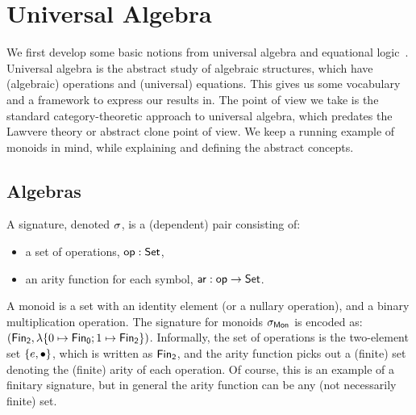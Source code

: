 \section{Universal Algebra}
\label{sec:universal-algebra}

We first develop some basic notions from universal algebra and equational
logic~\cite{birkhoffStructureAbstractAlgebras1935}.
%
Universal algebra is the abstract study of algebraic structures, which have (algebraic) operations and (universal)
equations.
%
This gives us some vocabulary and a framework to express our results in.
%
The point of view we take is the standard category-theoretic approach to universal algebra, which predates the Lawvere
theory or abstract clone point of view.
%
We keep a running example of monoids in mind, while explaining and defining the abstract concepts.

\subsection{Algebras}
\label{sec:universal-algebra:algebras}

\begin{definition}[Signature]
    A signature, denoted $\sigma$, is a (dependent) pair consisting of:
    \begin{itemize}
        \item a set of operations, $\operatorname{\mathsf{op}} : \mathsf{Set}$,
        \item an arity function for each symbol, $\operatorname{\mathsf{ar}} : \operatorname{\mathsf{op}} \to \mathsf{Set}$.
    \end{itemize}
\end{definition}

\begin{example}
    A monoid is a set with an identity element (or a nullary operation), and a binary multiplication operation.
    The signature for monoids $\sigma_{\mathsf{Mon}}$ is encoded as:
    $(\Fin[2],\lambda \{0 \mapsto \Fin[0] ; 1 \mapsto \Fin[2] \})$.
    Informally, the set of operations is the two-element set $\{e,\mathbin{\bullet}\}$, which is written as $\Fin[2]$,
    and the arity function picks out a (finite) set denoting the (finite) arity of each operation.
    Of course, this is an example of a finitary signature,
    but in general the arity function can be any (not necessarily finite) set.
\end{example}


